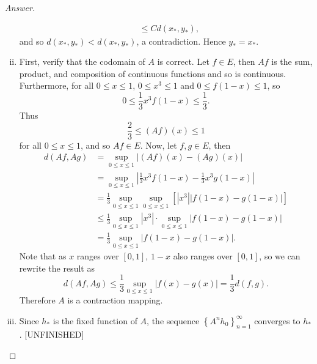 \documentclass[12pt]{article}
\newcommand\paren[1]{\left( #1 \right)}
\newcommand\setb[1]{\left \{ #1 \right \}}
\newcommand{\sqbrack}[1]{\left [ #1 \right ]}
\theoremstyle{definition}
\begin{document}
\begin{proof}[Answer]
\begin{enumerate}[(i)]
\begin{align*}
            & \leq C d(x_*,y_*),
        \end{align*}
        and so $d(x_*,y_*) < d(x_*,y_*)$, a contradiction. Hence $y_* = x_*$.
        \item First, verify that the codomain of $A$ is correct. Let $f \in E$, then $Af$ is the sum, product, and composition of continuous functions and so is continuous. Furthermore, for all $0 \leq x \leq 1$, $0 \leq x^3 \leq 1$ and $0 \leq f(1-x) \leq 1$, so 
        \[
            0 \leq \frac{1}{3} x^3 f(1-x) \leq \frac{1}{3}.
        \]
        Thus 
        \[
            \frac{2}{3} \leq (Af)(x) \leq 1
        \]
        for all $0 \leq x \leq 1$, and so $Af \in E$. Now, let $f , g \in E$, then 
        \begin{align*}
            d \paren{ Af , Ag } & = \sup\limits_{0 \leq x \leq 1} \left| (Af)(x) - (Ag)(x) \right| \\
            & = \sup\limits_{0 \leq x \leq 1} \left| \frac{1}{3} x^3 f(1-x) - \frac{1}{3} x^3 g(1-x) \right| \\
            & = \frac{1}{3} \sup\limits_{0 \leq x \leq 1} \sup\limits_{0 \leq x \leq 1} \sqbrack{ \left| x^3 \right| \left| f(1-x) - g(1-x) \right| } \\
            & \leq \frac{1}{3} \sup\limits_{0 \leq x \leq 1} \left| x^3 \right| \cdot \sup\limits_{0 \leq x \leq 1} \left| f(1-x) - g(1-x) \right| \\
            & = \frac{1}{3} \sup\limits_{0 \leq x \leq 1} \left| f(1-x) - g(1-x) \right|.
        \end{align*}
        Note that as $x$ ranges over $[0,1]$, $1-x$ also ranges over $[0,1]$, so we can rewrite the result as 
        \[
            d \paren{ Af , Ag } \leq \frac{1}{3} \sup\limits_{0 \leq x \leq 1} \left| f(x) - g(x) \right| = \frac{1}{3} d(f,g).
        \]
        Therefore $A$ is a contraction mapping.
        \item Since $h_*$ is the fixed function of $A$, the sequence $\setb{ A^n h_0 }_{n = 1}^{\infty}$ converges to $h_*$. [UNFINISHED]
    \end{enumerate}
\end{proof}
\end{document}
